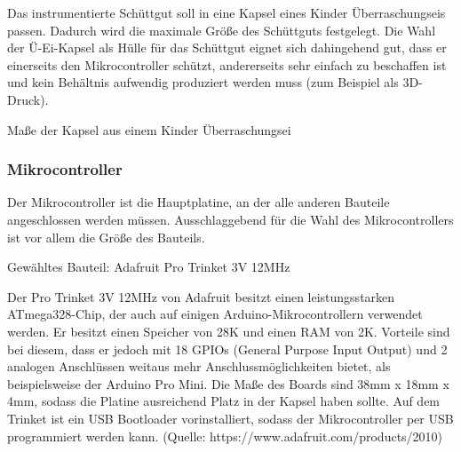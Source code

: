 Das instrumentierte Schüttgut soll in eine Kapsel eines Kinder Überraschungseis passen. Dadurch wird die maximale Größe des Schüttguts festgelegt. Die Wahl der Ü-Ei-Kapsel als Hülle für das Schüttgut eignet sich dahingehend gut, dass er einerseits den Mikrocontroller schützt, andererseits sehr einfach zu beschaffen ist und kein Behältnis aufwendig produziert werden muss (zum Beispiel als 3D-Druck).

Maße der Kapsel aus einem Kinder Überraschungsei

\subsubsection*{Mikrocontroller}

Der Mikrocontroller ist die Hauptplatine, an der alle anderen Bauteile angeschlossen werden müssen. Ausschlaggebend für die Wahl des Mikrocontrollers ist vor allem die Größe des Bauteils. 

Gewähltes Bauteil: Adafruit Pro Trinket 3V 12MHz

Der Pro Trinket 3V 12MHz von Adafruit besitzt einen leistungsstarken ATmega328-Chip, der auch auf einigen Arduino-Mikrocontrollern verwendet werden. Er besitzt einen Speicher von 28K und einen RAM von 2K. Vorteile sind bei diesem, dass er jedoch mit 18 GPIOs (General Purpose Input Output) und 2 analogen Anschlüssen weitaus mehr Anschlussmöglichkeiten bietet, als beispielsweise der Arduino Pro Mini. Die Maße des Boards sind  38mm x 18mm x 4mm, sodass die Platine ausreichend Platz in der Kapsel haben sollte. Auf dem Trinket ist ein USB Bootloader vorinstalliert, sodass der Mikrocontroller per USB programmiert werden kann. (Quelle: https://www.adafruit.com/products/2010)